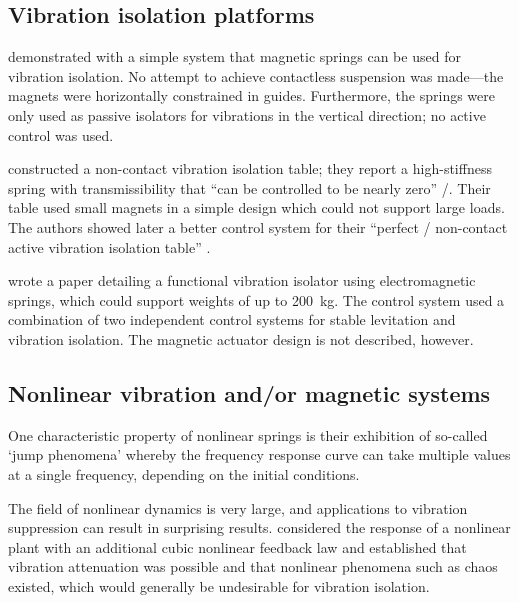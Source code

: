 \documentclass[11pt,a4paper]{memoir}
\begin{document}
\subsection{Vibration isolation platforms}

\textcite{puppin2002} demonstrated with a simple system that magnetic springs can be used for vibration isolation. No attempt to achieve contactless suspension was made—the magnets were horizontally constrained in guides.
Furthermore, the springs were only used as passive isolators for vibrations in the vertical direction; no active control was used.

\textcite{nagaya1993} constructed a non-contact vibration isolation table; they report a high-stiffness spring with transmissibility that \enquote{can be controlled to be nearly zero} \sic/.
Their table used small magnets in a simple design which could not support large loads.
The authors showed later a better control system for their \enquote{perfect \sic/
non-contact active vibration isolation table} \cite{nagaya1995a}.

\textcite{watanabe1996} wrote a paper detailing a functional vibration isolator using electromagnetic springs, which could support weights of up to
\SI{200}{kg}.
The control system used a combination of two independent control systems for stable levitation and vibration isolation.
The magnetic actuator design is not described, however.



\subsection{Nonlinear vibration and/or magnetic systems}

One characteristic property of nonlinear springs is their exhibition of so-called `jump phenomena' whereby the frequency response curve can take multiple values at a single frequency, depending on the initial conditions.

The field of nonlinear dynamics is very large, and applications to vibration suppression can result in surprising results.
\textcite{oueini1999} considered the response of a nonlinear plant with an additional cubic nonlinear feedback law and established that vibration attenuation was possible and that nonlinear phenomena such as chaos existed, which would generally be undesirable for vibration isolation.
\end{document}
